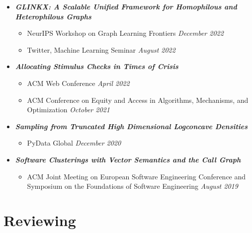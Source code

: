 \documentclass[margin]{res}
\newcommand{\bemph}[1]{\textbf{\emph{#1}}}
\begin{document}
\begin{resume}
\begin{itemize}[nosep]
	\item \bemph{GLINKX: A Scalable Unified Framework for Homophilous and Hetero\-philous Graphs}
	\begin{itemize}[nosep]
		\item NeurIPS Workshop on Graph Learning Frontiers  \hfill \emph{December 2022}
		\item Twitter, Machine Learning Seminar \hfill \emph{August 2022}
		
	\end{itemize}

 
	\item \bemph{Allocating Stimulus Checks in Times of Crisis} 
	\begin{itemize}[nosep]
		\item ACM Web Conference \hfill \emph{April 2022}
		\item ACM Conference on Equity and Access in Algorithms, Mechanisms, and Optimization \hfill \emph{October 2021}
	\end{itemize}

	\item \bemph{Sampling from Truncated High Dimensional Logconcave Densities}
	\begin{itemize}[nosep]
		\item PyData Global \hfill \emph{December 2020}
	\end{itemize}
	
	\item \bemph{Software Clusterings with Vector Semantics and the Call Graph}
	\begin{itemize}[nosep]
		\item ACM Joint Meeting on European Software Engineering Conference and Symposium on the Foundations of Software Engineering \hfill \emph{August 2019}
	\end{itemize} 
	
\end{itemize}

\section{Reviewing} 
%
%


\end{resume}
\end{document}

